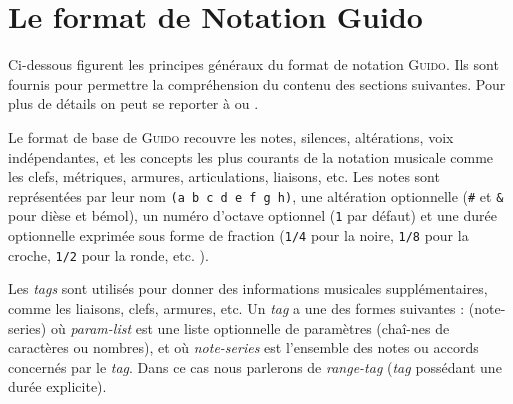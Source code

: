 \documentclass{article}
\newenvironment{gmncode}	{\vspace{-2mm}\small\verbatim}{\endverbatim\vspace{-2mm}}
\newcommand{\guido}			{\textsc{Guido}}
\newcommand{\code}[1]		{{\small \texttt{#1}}}
\begin{document}
\section{Le format de Notation Guido}\label{sec:format_notation}

Ci-dessous figurent les principes généraux du format de notation \guido{}. Ils sont fournis pour permettre la compréhension du contenu des sections suivantes. Pour plus de détails on peut se reporter à \cite{Dau09a} ou \cite{guido}.

Le format de base de \guido{} recouvre les notes, silences, altérations, voix indépendantes, et les concepts les plus courants de la notation musicale comme les clefs, métriques, armures, articulations, liaisons, etc.
Les notes sont représentées par leur nom \code{(a b c d e f g h)}, une altération optionnelle (\code{\#} et \code{\&} pour dièse et bémol), un numéro d'octave optionnel (\code{1} par défaut) et une durée optionnelle exprimée sous forme de fraction (\code{1/4} pour la noire, \code{1/8} pour la croche, \code{1/2} pour la ronde, etc. ).



Les \emph{tags} sont utilisés pour donner des informations musicales supplémentaires, comme les liaisons, clefs, armures, etc. Un \emph{tag} a une des formes suivantes : 
\vspace{1mm}
\begin{gmncode}
    (note-series)
\end{gmncode}
\vspace{1mm}
où \emph{param-list} est une liste optionnelle de paramètres (chaî-nes de caractères ou nombres), et où \emph{note-series} est l'ensemble des notes ou accords concernés par le \emph{tag}. Dans ce cas nous parlerons de \emph{range-tag} (\emph{tag} possédant une durée explicite).
\end{document}
